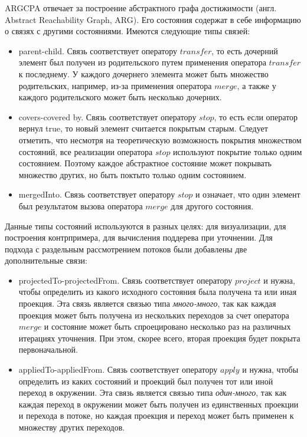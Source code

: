 ARGCPA отвечает за построение абстрактного графа достижимости (англ. Abstract Reachability Graph, ARG). 
Его состояния содержат в себе информацию о связях с другими состояниями.
Имеются следующие типы связей:
\begin{itemize}
\item parent-child. Связь соответствует оператору $transfer$, то есть дочерний элемент был получен из родительского путем применения оператора $transfer$ к последнему. 
У каждого дочернего элемента может быть множество родительских, например, из-за применения оператора $merge$, а также у каждого родительского может быть несколько дочерних.
\item covers-covered by. Связь соответствует оператору $stop$, то есть если оператор вернул true, то новый элемент считается покрытым старым. 
Следует отметить, что несмотря на теоретическую возможность покрытия множеством состояний, все реализации оператора $stop$ используют покрытие только одним состоянием.
Поэтому каждое абстрактное состояние может покрывать множество других, но быть поктыто только одним состоянием.
\item mergedInto.  Связь соответствует оператору $stop$ и означает, что один элемент был результатом вызова оператора $merge$ для другого состояния.
\end{itemize}

Данные типы состояний используются в разных целях: для визуализации, для построения контрпримера, для вычисления поддерева при уточнении.
Для подхода с раздельным рассмотрением потоков были добавлены две дополнительные связи:
\begin{itemize}
\item projectedTo-projectedFrom. Связь соответствует оператору $project$ и нужна, чтобы определить из какого исходного состояния была получена та или иная проекция.
Эта связь является связью типа \textit{много-много}, так как каждая проекция может быть получена из нескольких переходов за счет оператора $merge$ и состояние может быть спроецировано несколько раз на различных итерациях уточнения. 
При этом, скорее всего, вторая проекция будет покрыта первоначальной.
\item appliedTo-appliedFrom. Связь соответствует оператору $apply$ и нужна, чтобы определить из каких состояний и проекций был получен тот или иной переход в окружении.
Эта связь является связью типа \textit{один-много}, так как каждая переход в окружении может быть получен из единственных проекции и перехода в потоке, но каждая проекция и переход может быть применен к множеству других переходов.
\end{itemize}

